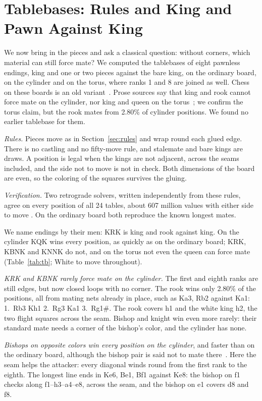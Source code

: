 \section{Tablebases: Rules and King and Pawn Against King}\label{S-tb}
We now bring in the pieces and ask a classical question: without corners, which material can still force
mate? We computed the tablebases of eight pawnless endings, king and one or two pieces against the bare
king, on the ordinary board, on the cylinder and on the torus, where ranks 1 and 8 are joined as well. Chess
on these boards is an old variant~\cite{Pritchard}. Prose sources say that king and rook cannot force mate
on the cylinder, nor king and queen on the torus~\cite{WikiCylinder,HGMCylinder}; we confirm the torus claim,
but the rook mates from 2.80\% of cylinder positions. We found no earlier tablebase for them.

\emph{Rules.} Pieces move as in Section~\ref{sec:rules} and wrap round each glued edge. There is no castling
and no fifty-move rule, and stalemate and bare kings are draws. A position is legal when the kings are not
adjacent, across the seams included, and the side not to move is not in check. Both dimensions of the board
are even, so the coloring of the squares survives the gluing.

\emph{Verification.} Two retrograde solvers, written independently from these rules, agree on every position
of all 24 tables, about 607 million values with either side to move . On the ordinary board both
reproduce the known longest mates.



We name endings by their men: KRK is king and rook against king. On the cylinder KQK wins every position, as quickly as on the ordinary board; KRK, KBNK and KNNK do not, and
on the torus not even the queen can force mate (Table~\ref{tab:tb}; White to move throughout).

\emph{KRK and KBNK rarely force mate on the cylinder.} The first and eighth ranks are still edges, but now
closed loops with no corner. The rook wins only 2.80\% of the positions, all from mating nets already
in place, such as Ka3, Rb2 against Ka1: 1.~Rb3 Kh1 2.~Rg3 Ka1 3.~Rg1\#. The rook covers h1 and the
white king h2, the two flight squares across the seam. Bishop and knight win even more rarely: their standard mate
needs a corner of the bishop's color, and the cylinder has none.

\emph{Bishops on opposite colors win every position on the cylinder}, and faster than on the ordinary board,
although the bishop pair is said not to mate there~\cite{HGMCylinder}.
Here the seam helps the attacker: every diagonal winds round from the first rank to the eighth. The longest
line ends in Ke6, Be1, Bf1 against Ke8: the bishop on f1 checks along f1--h3--a4--e8, across the seam, and
the bishop on e1 covers d8 and f8.

